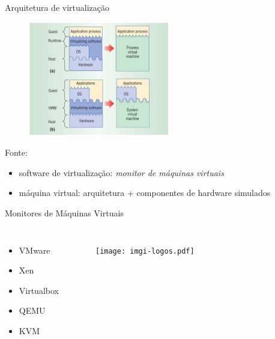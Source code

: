 \documentclass{beamer}
\begin{document}
\begin{frame}{Arquitetura de virtualização}
\begin{figure}
\centering
\includegraphics[height=5cm]{img/img-smith2005vir.png}
\end{figure}
\tiny{Fonte: \cite{smith2005architecture}}
\begin{itemize}
\item software de virtualização: \emph{monitor de máquinas virtuais}
\item máquina virtual: arquitetura + componentes de hardware simulados
\end{itemize}
\end{frame}

\begin{frame}{Monitores de Máquinas Virtuais}
\begin{columns}[c]
\column{1.5in}
\begin{itemize}
  \item VMware
  \item Xen
  \item Virtualbox
  \item QEMU
  \item KVM
\end{itemize}
\column{1.5in}
\begin{figure}
\centering
\texttt{[image: imgi-logos.pdf]}
\end{figure}
\end{columns}
\end{frame}

\end{document}
